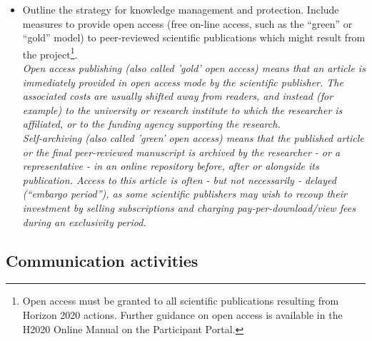 {\begin{itemize}
\emph{The appropriate structure of the consortium to support exploitation is addressed in section 3.3.}\\
\item Outline the strategy for knowledge management and protection. Include measures to provide open access (free on-line access, such as the ``green'' or ``gold'' model) to peer-reviewed scientific publications which might result from the project\footnote{Open access must be granted to all scientific publications resulting from Horizon 2020 actions. Further guidance on open access is available in the H2020 Online Manual on the Participant Portal.}.\\
\emph{Open access publishing (also called 'gold' open access) means that an article is immediately provided in open access mode by the scientific publisher. The associated costs are usually shifted away from readers, and instead (for example) to the university or research institute to which the researcher is affiliated, or to the funding agency supporting the research.}\\
\emph{Self-archiving (also called 'green' open access) means that the published article or the final peer-reviewed manuscript is archived by the researcher - or a representative - in an online repository before, after or alongside its publication. Access to this article is often - but not necessarily - delayed (``embargo period''), as some scientific publishers may wish to recoup their investment by selling subscriptions and charging pay-per-download/view fees during an exclusivity period.}
\end{itemize}
}

\subsection{Communication activities}
\label{sec:communication}
